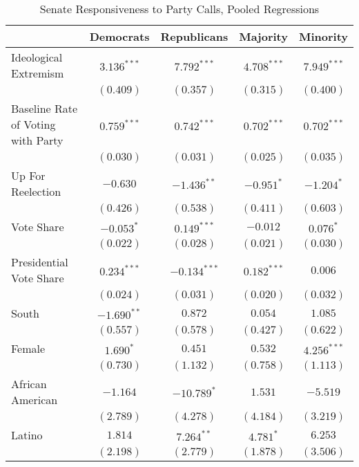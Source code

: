 \documentclass[12pt]{article}
\begin{document}
\begin{table}[H]
	\begin{center}
		\caption{Senate Responsiveness to Party Calls, Pooled Regressions}
		\begin{tabular}{l c c c c }
			\hline
			& Democrats & Republicans & Majority & Minority \\
			\hline
			Ideological Extremism & $3.136^{***}$  & $7.792^{***}$   & $4.708^{***}$  & $7.949^{***}$ \\
			& $(0.409)$      & $(0.357)$       & $(0.315)$      & $(0.400)$     \\
			Baseline Rate of Voting with Party              & $0.759^{***}$  & $0.742^{***}$   & $0.702^{***}$  & $0.702^{***}$ \\
			& $(0.030)$      & $(0.031)$       & $(0.025)$      & $(0.035)$     \\
			Up For Reelection    & $-0.630$       & $-1.436^{**}$   & $-0.951^{*}$   & $-1.204^{*}$  \\
			& $(0.426)$      & $(0.538)$       & $(0.411)$      & $(0.603)$     \\
			Vote Share            & $-0.053^{*}$  & $0.149^{***}$  & $-0.012$       & $0.076^{*}$   \\
			& $(0.022)$     & $(0.028)$      & $(0.021)$      & $(0.030)$     \\
			Presidential Vote Share       & $0.234^{***}$ & $-0.134^{***}$ & $0.182^{***}$  & $0.006$       \\
			& $(0.024)$     & $(0.031)$      & $(0.020)$      & $(0.032)$     \\
			South                  & $-1.690^{**}$  & $0.872$         & $0.054$        & $1.085$       \\
			& $(0.557)$      & $(0.578)$       & $(0.427)$      & $(0.622)$     \\
			Female                 & $1.690^{*}$    & $0.451$         & $0.532$        & $4.256^{***}$ \\
			& $(0.730)$      & $(1.132)$       & $(0.758)$      & $(1.113)$     \\
			African American                   & $-1.164$       & $-10.789^{*}$   & $1.531$        & $-5.519$      \\
			& $(2.789)$      & $(4.278)$       & $(4.184)$      & $(3.219)$     \\
			Latino                 & $1.814$        & $7.264^{**}$    & $4.781^{*}$    & $6.253$       \\
			& $(2.198)$      & $(2.779)$       & $(1.878)$      & $(3.506)$     \\

\end{tabular}
\end{center}
\end{table}
\end{document}
